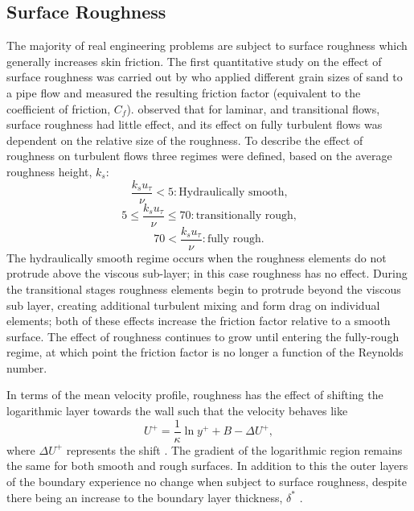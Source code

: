 \documentclass[12pt,oneside,a4paper]{article}
\begin{document}
\subsection{Surface Roughness}
\label{section:literatureReview:roughness}
The majority of real engineering problems are subject to surface roughness which generally increases skin friction. The first quantitative study on the effect of surface roughness was carried out by \cite{nikuradse1933} who applied different grain sizes of sand to a pipe flow and measured the resulting friction factor (equivalent to the coefficient of friction, $C_f$). \cite{nikuradse1933} observed that for laminar, and transitional flows, surface roughness had little effect, and its effect on fully turbulent flows was dependent on the relative size of the roughness. To describe the effect of roughness on turbulent flows three regimes were defined, based on the average roughness height, $k_s$:
%
$$\frac{k_s u_\tau}{\nu} < 5: \text{Hydraulically smooth,} $$
$$5 \leq \frac{k_s u_\tau}{\nu} \leq 70:	\text{transitionally rough,} $$
$$70 < \frac{k_s u_\tau}{\nu}:	\text{fully rough.}		$$
%
The hydraulically smooth regime occurs when the roughness elements do not protrude above the viscous sub-layer; in this case roughness has no effect. During the transitional stages roughness elements begin to protrude beyond the viscous sub layer, creating additional turbulent mixing and form drag on individual elements; both of these effects increase the friction factor relative to a smooth surface. The effect of roughness continues to grow until entering the fully-rough regime, at which point the friction factor is no longer a function of the Reynolds number.

In terms of the mean velocity profile, roughness has the effect of shifting the logarithmic layer towards the wall such that the velocity behaves like
\begin{equation}
\label{equation:litReview:roughLawOfWall}
U^+ = \frac{1}{\kappa} \ln{y^+} + B - \Delta U^+,
\end{equation}
where $\Delta U^+$ represents the shift \citep{newhall2006}. The gradient of the logarithmic region remains the same for both smooth and rough surfaces. In addition to this the outer layers of the boundary experience no change when subject to surface roughness, despite there being an increase to the boundary layer thickness, $\delta^*$ \citep{perlin2016}.
\end{document}
